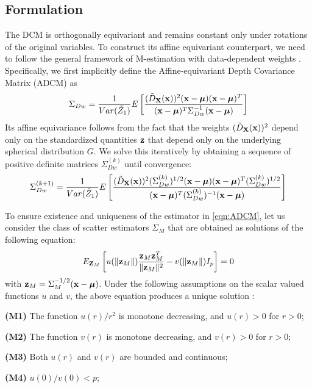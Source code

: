 \documentclass[12pt,letterpaper]{article}
\theoremstyle{definition} \newtheorem{Definition}[Theorem]{Definition}
\begin{document}
\subsection{Formulation}
The DCM is orthogonally equivariant and remains constant only under rotations of the original variables. To construct its affine equivariant counterpart, we need to follow the general framework of M-estimation with data-dependent weights \cite{HuberBook81}. Specifically, we first implicitly define the Affine-equivariant Depth Covariance Matrix (ADCM) as
%
\begin{equation} \label{eqn:ADCM}
\Sigma_{Dw} = \frac{1}{Var (\tilde Z_1) } E \left[ \frac{(\tilde D_{\mathbf{X}}({\bf{x}}))^2 ({\bf{x}} - {\boldsymbol{\mu}}) ({\bf{x}} - {\boldsymbol{\mu}})^T}{({\bf{x}} - {\boldsymbol{\mu}})^T \Sigma_{Dw}^{-1} ({\bf{x}} - {\boldsymbol{\mu}})} \right]
\end{equation}
%
Its affine equivariance follows from the fact that the weights $(\tilde D_{\mathbf{X}} ({\bf{x}}))^2$ depend only on the standardized quantities ${\bf{z}}$ that depend only on the underlying spherical distribution $G$. We solve this iteratively by obtaining a sequence of positive definite matrices $\Sigma^{(k)}_{Dw}$ until convergence:
%
$$ \Sigma^{(k+1)}_{Dw} = \frac{1}{Var (\tilde Z_1) } E \left[ \frac{(\tilde D_{\mathbf{X}}({\bf{x}}))^2 (\Sigma^{(k)}_{Dw})^{1/2} ({\bf{x}} - {\boldsymbol{\mu}}) ({\bf{x}} - {\boldsymbol{\mu}})^T (\Sigma^{(k)}_{Dw})^{1/2}}{({\bf{x}} - {\boldsymbol{\mu}})^T (\Sigma^{(k)}_{Dw})^{-1} ({\bf{x}} - {\boldsymbol{\mu}})} \right] $$
%

To ensure existence and uniqueness of the estimator in \ref{eqn:ADCM}, let us consider the class of scatter estimators $\Sigma_M$ that are obtained as solutions of the following equation:
%
\begin{equation}
E_{{\mathbf{Z}}_M} \left[ u( \| {\bf{z}}_M \| )  \frac{{\bf{z}}_M {\bf{z}}_M^T}{\| {\bf{z}}_M \|^2}  - v( \| {\bf{z}}_M \| ) I_p \right] = 0
\end{equation}
%
with ${\bf{z}}_M = \Sigma_M^{-1/2} ({\bf{x}} - {\boldsymbol{\mu}})$. Under the following assumptions on the scalar valued functions $u$ and $v$, the above equation produces a unique solution \citep{HuberBook81}:
%

\vspace{1em}
\noindent\textbf{(M1)} The function $u(r)/r^2$ is monotone decreasing, and $u(r)>0$ for $r>0$;

\noindent\textbf{(M2)}  The function $v(r)$ is monotone decreasing, and $v(r)>0$ for $r>0$;

\noindent\textbf{(M3)} Both $u(r)$ and $v(r)$ are bounded and continuous;

\noindent\textbf{(M4)} $u(0) / v(0) < p$;
\end{document}
